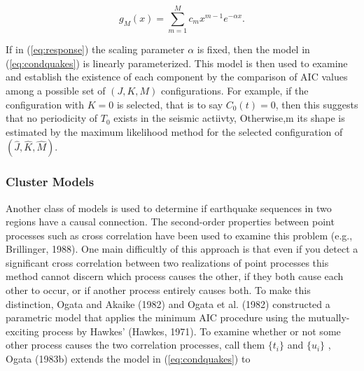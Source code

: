 \documentclass[12pt]{article} %
\theoremstyle{plain}
\begin{document}
	\begin{equation} \label{eq:response}
		g_M(x)= \sum_{m=1}^{M} c_m x^{m-1} e^{-\alpha x}. 
	\end{equation}

	If in (\ref{eq:response}) the scaling parameter $\alpha$ is fixed, then the model in (\ref{eq:condquakes}) is linearly parameterized. This model is then used to examine and establish the existence of each component by the comparison of AIC values among a possible set of $(J,K,M)$ configurations. For example, if the configuration with $K=0$ is selected, that is to say $ C_0(t)=0$, then this suggests that no periodicity of $T_0$ exists in the seismic actiivty, Otherwise,m its shape is estimated by the maximum likelihood method for the selected configuration of $(\hat{J}, \hat{K}, \hat{M})$. 
	

	
	\subsubsection{Cluster Models}
	
	Another class of models is used to determine if earthquake sequences in two regions have a causal connection. The second-order properties between point processes such as cross correlation have been used to examine this problem (e.g., Brillinger, 1988). One main difficultly of this approach is that even if you detect a significant cross correlation between two realizations of point processes this method cannot discern which process causes the other, if they both cause each other to occur, or if another process entirely causes both. To make this distinction, Ogata and Akaike (1982) and Ogata et al. (1982) constructed a parametric model that applies the minimum AIC procedure using the mutually-exciting process by Hawkes' (Hawkes, 1971). To examine whether or not some other process causes the two correlation processes, call them $\lbrace t_i \rbrace $ and $\lbrace u_i \rbrace $ , Ogata (1983b) extends the model in (\ref{eq:condquakes}) to 
	
\end{document}
